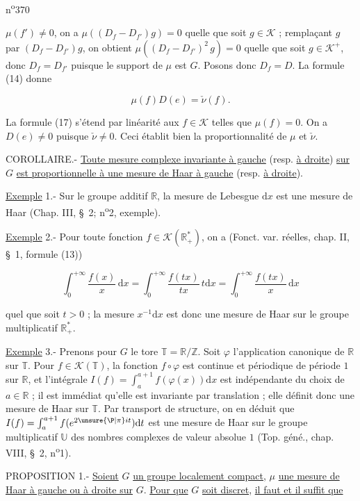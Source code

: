
 \hfill n\textsuperscript{o}370

$\mu(f')\ne0$, on a $\mu((D_f-D_{f'})g)=0$ quelle que soit $g\in\mathcal{K}$ ; remplaçant $g$ par $(D_f-D_{f'})g$, on obtient $\mu((D_f-D_{f'})^2\,g)=0$ quelle que soit $g\in\mathcal{K}^+$, donc $D_f=D_{f'}$ puisque le support de $\mu$ est $G$. Posons donc $D_f=D$. La formule (14) donne

\[
\mu(f)D(e)=\check{\nu}(f). \tag*{(17)}
\]

La formule (17) s'étend par linéarité aux $f\in\mathcal{K}$ telles que $\mu(f)=0$. On a $D(e)\ne0$ puisque $\check{\nu}\ne0$. Ceci établit bien la proportionnalité de $\mu$ et $\check{\nu}$.

COROLLAIRE.- \uline{Toute mesure complexe invariante à gauche} (resp. \uline{à droite}) \uline{sur} $G$ \uline{est proportionnelle à une mesure de Haar à gauche} (resp. \uline{à droite}).

\uline{Exemple} 1.- Sur le groupe additif $\mathbb{R}$, la mesure de Lebesgue $\mathrm{d}x$ est une mesure de Haar (Chap. III, \S\ 2; n\textsuperscript{o}2, exemple).

\uline{Exemple} 2.- Pour toute fonction $f\in\mathcal{K}(\mathbb{R}_+^*)$, on a (Fonct. var. réelles, chap. II, \S\ 1, formule (13))

\[
\int_0^{+\infty}\frac{f(x)}{x}\,\mathrm{d}x
=\int_0^{+\infty}\frac{f(tx)}{tx}\,t\mathrm{d}x
=\int_0^{+\infty}\frac{f(tx)}{x}\,\mathrm{d}x
\]

quel que soit $t>0$ ; la mesure $x^{-1}\mathrm{d}x$ est donc une mesure de Haar sur le groupe multiplicatif $\mathbb{R}_+^*$.

\uline{Exemple} 3.- Prenons pour $G$ le tore $\mathbb{T}=\mathbb{R}/\mathbb{Z}$. Soit $\varphi$ l'application canonique de $\mathbb{R}$ sur $\mathbb{T}$. Pour $f\in\mathcal{K}(\mathbb{T})$, la fonction $f\circ\varphi$ est continue et périodique de période $1$ sur $\mathbb{R}$, et l'intégrale $I(f)=\int_a^{a+1}f(\varphi(x))\mathrm{d}x$ est indépendante du choix de $a\in\mathbb{R}$ ; il est immédiat qu'elle est invariante par translation ; elle définit donc une mesure de Haar sur $\mathbb{T}$. Par transport de structure, on en déduit que $I(f)=\int_a^{a+1}f(e^{2\unsure{\text{\P}|\pi}it})\mathrm{d}t$ est une mesure de Haar sur le groupe multiplicatif $\mathbb{U}$ des nombres complexes de valeur absolue $1$ (Top. géné., chap. VIII, \S\ 2, n\textsuperscript{o}1).

PROPOSITION 1.- \uline{Soient} $G$ \uline{un groupe localement compact}, $\mu$ \uline{une mesure de Haar à gauche ou à droite sur} $G$. \uline{Pour que} $G$ \uline{soit discret}, \uline{il faut et il suffit que}
